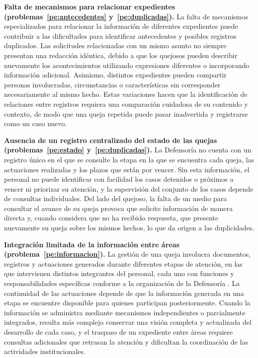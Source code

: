 	\textbf{Falta de mecanismos para relacionar expedientes (problemas~\ref{pe:antecedentes} y~\ref{pe:duplicadas}).} La falta de mecanismos especializados para relacionar la información de diferentes expedientes puede contribuir a las dificultades para identificar antecedentes y posibles registros duplicados. Las solicitudes relacionadas con un mismo asunto no siempre presentan una redacción idéntica, debido a que los quejosos pueden describir nuevamente los acontecimientos utilizando expresiones diferentes o incorporando información adicional. Asimismo, distintos expedientes pueden compartir personas involucradas, circunstancias o características sin corresponder necesariamente al mismo hecho. Estas variaciones hacen que la identificación de relaciones entre registros requiera una comparación cuidadosa de su contenido y contexto, de modo que una queja repetida puede pasar inadvertida y registrarse como un caso nuevo.

	\textbf{Ausencia de un registro centralizado del estado de las quejas (problemas~\ref{pe:estado} y~\ref{pe:duplicadas}).} La Defensoría no cuenta con un registro único en el que se consulte la etapa en la que se encuentra cada queja, las actuaciones realizadas y los plazos que están por vencer. Sin esta información, el personal no puede identificar con facilidad los casos detenidos o próximos a vencer ni priorizar su atención, y la supervisión del conjunto de los casos depende de consultas individuales. Del lado del quejoso, la falta de un medio para consultar el avance de su queja provoca que solicite información de manera directa y, cuando considera que no ha recibido respuesta, que presente nuevamente su queja sobre los mismos hechos, lo que da origen a las duplicidades.

	\textbf{Integración limitada de la información entre áreas (problema~\ref{pe:informacion}).} La gestión de una queja involucra documentos, registros y actuaciones generados durante diferentes etapas de atención, en las que intervienen distintos integrantes del personal, cada uno con funciones y responsabilidades específicas conforme a la organización de la Defensoría \cite{ipn_manual_organizacion_ddp}. La continuidad de las actuaciones depende de que la información generada en una etapa se encuentre disponible para quienes participan posteriormente. Cuando la información se administra mediante mecanismos independientes o parcialmente integrados, resulta más complejo conservar una visión completa y actualizada del desarrollo de cada caso, y el traspaso de un expediente entre áreas requiere consultas adicionales que retrasan la atención y dificultan la coordinación de las actividades institucionales.

